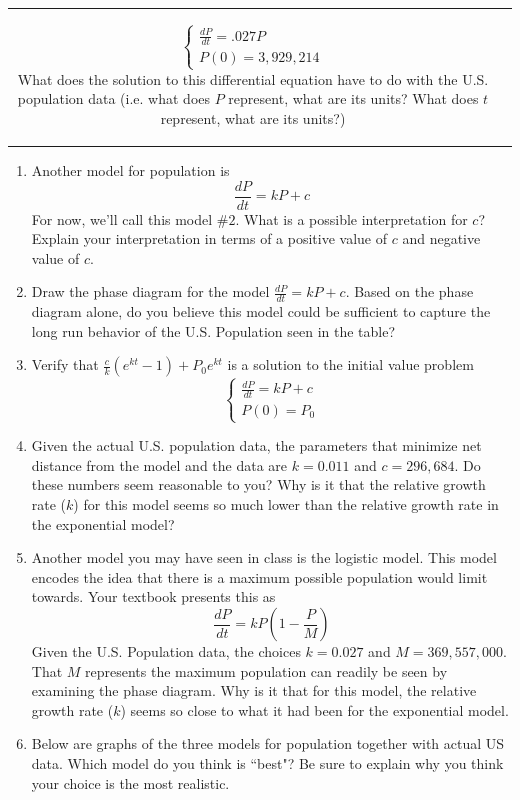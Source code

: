 \documentclass[12pt]{article}
\newcounter{mycounter}
\begin{document}
\begin{tabular}{cl}
\begin{minipage}{.7\textwidth}
\begin{enumerate}
$$\begin{cases} \frac{d P}{dt } = . 027 P \\ P(0) = 3,929,214\end{cases}$$ 
What does the solution to this differential equation have to do with the U.S. population data (i.e. what does $P$ represent, what are its units? What does $t$ represent, what are its units?) 

\setcounter{mycounter}{\value{enumi}}
\end{enumerate}
\end{minipage}
\end{tabular}
\begin{enumerate}
\setcounter{enumi}{\value{mycounter}}
\item Another model for population is
$$\frac{d P }{d t } = k P + c$$
For now, we'll call this model $\# 2$. What is a possible interpretation for $c$? Explain your interpretation in terms of a positive value of $c$ and negative value of $c$.
\item Draw the phase diagram for the model $\frac{d P }{d t } = k P + c$. Based on the phase diagram alone, do you believe this model could be sufficient to capture the long run behavior of the U.S. Population seen in the table?
\item Verify that $\frac{c }{k}\left(e^{k t}-1\right)+P_0 e^{k t}$ is a solution to the initial value problem 
$$\begin{cases} \frac{d P}{dt } = k P + c \\ P(0) =   P_0\end{cases}$$
\newpage
\item Given the actual U.S. population data, the parameters that minimize net distance from the model and the data are $k = 0.011$ and $c = 296,684$.  Do these numbers seem reasonable to you? Why is it that the relative growth rate ($k$) for this model seems so much lower than the relative growth rate in the exponential model? 
\item Another model you may have seen in class is the logistic model. This model encodes the idea that there is a maximum possible population would limit towards. Your textbook presents this as
$$ \frac{d P}{ dt} = k P \left( 1 - \frac{P}{M} \right) $$
Given the U.S. Population data, the choices $k = 0.027$ and $M =  369,557,000$. That $M$ represents the maximum population can readily be seen by examining the phase diagram. Why is it that for this model, the relative growth rate ($k$) seems so close to what it had been for the exponential model. 
\item Below are graphs of the three models for population together with actual US data. Which model do you think is ``best"? Be sure to explain why you think your choice is the most realistic. 

\end{enumerate}
\end{document}
